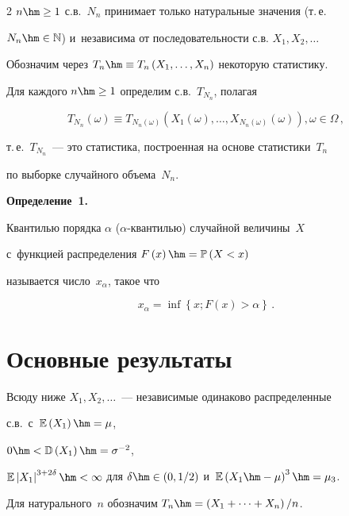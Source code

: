 \begin{multicols}{2}
$n \hm\ge 1$ с.в.~$N_n$ принимает только натуральные значения (т.\,е.\

$N_n \hm\in \mathbb{N}$) и~независима от последовательности с.в. $X_1, X_2, \ldots$



Обозначим через $T_n \hm\equiv T_n \left(X_1, \ldots, X_n\right)$ некоторую статистику.

 Для каждого $n \hm\ge 1$ определим с.в.~$T_{N_n}$, полагая

$$

T_{N_n} (\omega) \equiv T_{N_n(\omega)} \left(X_1 (\omega), \ldots, X_{N_n (\omega)} 

(\omega)\right),\omega \in \Omega\,,

$$

т.\,е.\ $T_{N_n}$~--- это статистика, построенная на основе статистики~$T_n$ 

по выборке случайного объема~$N_n$.



\smallskip



\noindent

\textbf{Определение~1.}\

Квантилью порядка $\alpha$ ($\alpha$-кван\-тилью) случайной величины~$X$ 

с~функцией распределения $F\left(x\right)\hm=\mathbb{P}\left(X<x\right)$ 

называется число~$x_{\alpha}$, такое что

$$ 

x_{\alpha} = \inf \left\{ x; F(x)>\alpha \right\}\,.

 $$



\section{Основные результаты}



Всюду ниже $X_1, X_2, \ldots $~--- независимые одинаково распределенные 

с.в.\ с~$\mathbb{E}\left(X_1\right)\hm=\mu$, 

$ 0\hm<\mathbb{D}\left(X_1\right)\hm=\sigma^{-2}$, 

$\mathbb{E}\left|X_1\right|^{3+2\delta}\hm < \infty$ для $\delta\hm \in 

\left(0,1/2\right)$ и~$\mathbb{E}\left(X_1\hm-\mu\right)^{3}\hm=\mu_3$. 

Для натурального~$n$ обозначим $T_n\hm=\left(X_1+\cdots+X_n\right)/n$.




\end{multicols}
